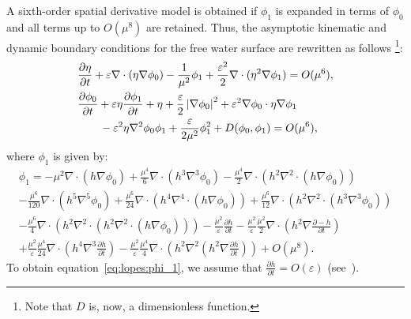 A sixth-order spatial derivative model is obtained if
$\phi_1$ is expanded in terms of $\phi_0$ and all terms up
to $O(\mu^8)$ are retained.  Thus, the asymptotic kinematic
and dynamic boundary conditions for the free water surface
are rewritten as follows \footnote{Note that $D$
is, now, a  dimensionless function.}:
\begin{subequations}\label{eq:lopes:kindyn}
\begin{align}
&\displaystyle\frac{\partial \eta}{\partial t}+\varepsilon\nabla\cdot(\eta\nabla\phi_0)-\frac{1}{\mu^2}\phi_1+
  \frac{\varepsilon^2}{2}\nabla\cdot(\eta^2\nabla\phi_1)=O(\mu^{6}),
\vspace{0.3cm}\\ &\displaystyle
\frac{\partial \phi_0}{\partial t}+\varepsilon\eta\frac{\partial \phi_1}{\partial t}+\eta +
\frac{\varepsilon}{2}
\left|\nabla\phi_0\right|^2+\varepsilon^2\nabla\phi_0\cdot\eta\nabla\phi_1\nonumber
\\ & \displaystyle \qquad
-\varepsilon^2\eta\nabla^2\phi_0\phi_1
+\frac{\varepsilon}{2\mu^2}\phi_1^2
+D(\phi_0,\phi_1)
=O(\mu^{6}),
\end{align}
\end{subequations}
where $\phi_1$ is given by:
\begin{multline}\label{eq:lopes:phi_1}
\phi_1= -\mu^{2}\nabla\cdot\left(h\nabla\phi_0\right)
+\frac{\mu^{4}}{6}\nabla\cdot\left(h^3\nabla^3\phi_0\right)
-\frac{\mu^{4}}{2}\nabla\cdot\left(h^2
\nabla^2\cdot\left(h\nabla\phi_0\right)
\right)\\
-\frac{\mu^6}{120}\nabla\cdot\left(h^5\nabla^5\phi_0\right)+
\frac{\mu^6}{24}\nabla\cdot\left(h^4\nabla^4\cdot\left(h\nabla\phi_0\right)\right)+\frac{\mu^6}{12}\nabla\cdot\left(h^2\nabla^2\cdot\left(h^3\nabla^3\phi_0\right)\right)\\
-\frac{\mu^6}{4}\nabla\cdot\left(h^2\nabla^2\cdot\left(h^2\nabla^2\cdot\left(h\nabla\phi_0\right)\right)\right)
-\frac{\mu^2}{\varepsilon}\frac{\partial h}{\partial t}-
\frac{\mu^2}{\varepsilon}\frac{\mu^2}{2}\nabla\cdot\left(h^2\nabla\frac{\partial
-h}{\partial t}\right)\\
+\frac{\mu^2}{\varepsilon}\frac{\mu^4}{24}\nabla\cdot\left(h^4\nabla^3
\frac{\partial h}{\partial t}\right)
-\frac{\mu^2}{\varepsilon}\frac{\mu^4}{4}\nabla\cdot\left(h^2\nabla^2\left(h^2\nabla\frac{\partial h}{\partial t}\right)\right)+O(\mu^{8}).
\end{multline}
To obtain equation~\eqref{eq:lopes:phi_1}, we assume that
$\displaystyle\frac{\partial h}{\partial t}=O(\varepsilon)$
(see~\citet{DutykhDias2007}).

